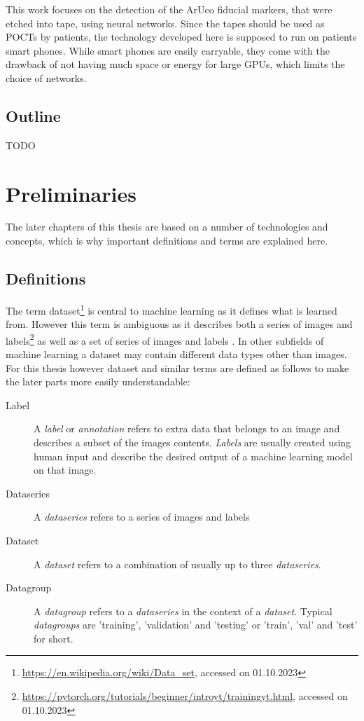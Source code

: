 \documentclass[10pt]{book}
\begin{document}
This work focuses on the detection of the \ac{ArUco} fiducial markers, that were etched into tape, using neural networks. Since the tapes should be used as \acp{POCT} by patients, the technology developed here is supposed to run on patients smart phones. While smart phones are easily carryable, they come with the drawback of not having much space or energy for large \acp{GPU}, which limits the choice of networks.

\section{Outline}

TODO

\chapter{Preliminaries}
\label{chap:prelim}

The later chapters of this thesis are based on a number of technologies and concepts, which is why important definitions and terms are explained here.

\section{Definitions}

The term dataset\footnote{\url{https://en.wikipedia.org/wiki/Data_set}, accessed on 01.10.2023} is central to machine learning as it defines what is learned from. However this term is ambiguous as it describes both a series of images and labels\footnote{\url{https://pytorch.org/tutorials/beginner/introyt/trainingyt.html}, accessed on 01.10.2023} as well as a set of series of images and labels \cite{lin2014microsoft}. In other subfields of machine learning a dataset may contain different data types other than images. For this thesis however dataset and similar terms are defined as follows to make the later parts more easily understandable:

\begin{description}
  \item[Label] A \textit{label} or \textit{annotation} refers to extra data that belongs to an image and describes a subset of the images contents. \textit{Labels} are usually created using human input and describe the desired output of a machine learning model on that image.
  \item[Dataseries] A \textit{dataseries} refers to a series of images and labels
  \item[Dataset] A \textit{dataset} refers to a combination of usually up to three \textit{dataseries}.
  \item[Datagroup] A \textit{datagroup} refers to a \textit{dataseries} in the context of a \textit{dataset}. Typical \textit{datagroups} are 'training', 'validation' and 'testing' or 'train', 'val' and 'test' for short.
\end{description}
\end{document}
